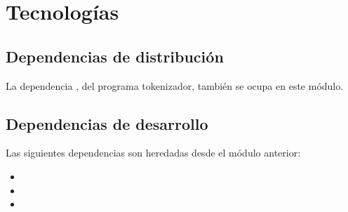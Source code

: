 %
%

\section{Tecnologías}

\subsection{Dependencias de distribución}

La dependencia , del programa tokenizador, también se
ocupa en este módulo.



\subsection{Dependencias de desarrollo}

Las siguientes dependencias son heredadas desde el módulo anterior:

\begin{itemize}
  \item {}
  \item {}
  \item {}
\end{itemize}
